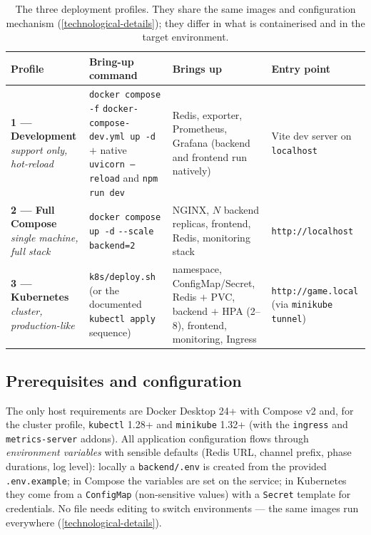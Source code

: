 \documentclass{scrartcl}
\begin{document}
\begin{table}[H]
  \centering
  \footnotesize
  \setlength{\tabcolsep}{6pt}
  \renewcommand{\arraystretch}{1.25}
  \caption{The three deployment profiles. They share the same images and
    configuration mechanism (\cref{technological-details}); they differ in
    what is containerised and in the target environment.}
  \label{tab:profiles}
  \begin{tabular}{@{}
    >{\raggedright\arraybackslash}p{2.6cm}
    >{\raggedright\arraybackslash}p{4.2cm}
    >{\raggedright\arraybackslash}p{3.8cm}
    >{\raggedright\arraybackslash}p{2.6cm}@{}}
    \toprule
    \textbf{Profile} & \textbf{Bring-up command} & \textbf{Brings up}
      & \textbf{Entry point} \\
    \midrule
    \textbf{1 --- Development} \newline \emph{support only, hot-reload}
      & \texttt{docker compose -f} \texttt{docker-compose-dev.yml up -d}
        \newline $+$ native \texttt{uvicorn --reload} and \texttt{npm run dev}
      & Redis, exporter, Prometheus, Grafana (backend and frontend run
        natively)
      & Vite dev server on \texttt{localhost} \\
    \addlinespace
    \textbf{2 --- Full Compose} \newline \emph{single machine, full stack}
      & \texttt{docker compose up -d} \texttt{-{}-scale backend=2}
      & NGINX, $N$ backend replicas, frontend, Redis, monitoring stack
      & \texttt{http://localhost} \\
    \addlinespace
    \textbf{3 --- Kubernetes} \newline \emph{cluster, production-like}
      & \texttt{k8s/deploy.sh} \newline (or the documented
        \texttt{kubectl apply} sequence)
      & namespace, ConfigMap/Secret, Redis $+$ PVC, backend $+$ HPA (2--8),
        frontend, monitoring, Ingress
      & \texttt{http://game.local} \newline (via \texttt{minikube tunnel}) \\
    \bottomrule
  \end{tabular}
\end{table}

\subsection{Prerequisites and configuration}

The only host requirements are Docker Desktop 24+ with Compose v2 and,
for the cluster profile, \texttt{kubectl} 1.28+ and \texttt{minikube}
1.32+ (with the \texttt{ingress} and \texttt{metrics-server} addons).
All application configuration flows through \emph{environment variables}
with sensible defaults (Redis URL, channel prefix, phase durations, log
level): locally a \texttt{backend/.env} is created from the provided
\texttt{.env.example}; in Compose the variables are set on the service;
in Kubernetes they come from a \texttt{ConfigMap} (non-sensitive values)
with a \texttt{Secret} template for credentials. No file needs editing to
switch environments --- the same images run everywhere
(\cref{technological-details}).
\end{document}
